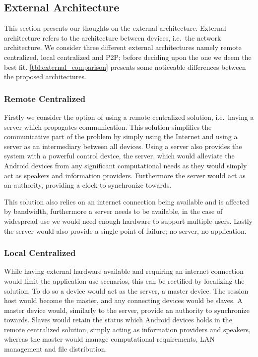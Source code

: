 \subsection{External Architecture}\label{sec:external_architectures}
This section presents our thoughts on the external architecture.
External architecture refers to the architecture between devices, i.e.\ the network architecture.
We consider three different external architectures namely remote centralized, local centralized and \ac{P2P}; before deciding upon the one we deem the best fit.
\cref{tbl:external_comparison} presents some  noticeable differences between the proposed architectures.

\subsubsection{Remote Centralized}
Firstly we consider the option of using a remote centralized solution, i.e.\ having a server which propagates communication.
This solution simplifies the communicative part of the problem by simply using the Internet and using a server as an intermediary between all devices.
Using a server also provides the system with a powerful control device, the server, which would alleviate the Android devices from any significant computational needs as they would simply act as speakers and information providers.
Furthermore the server would act as an authority, providing a clock to synchronize towards.

This solution also relies on an internet connection being available and is affected by bandwidth, furthermore a server needs to be available, in the case of widespread use we would need enough hardware to support multiple users.
Lastly the server would also provide a single point of failure; no server, no application.

\subsubsection{Local Centralized}
While having external hardware available and requiring an internet connection would limit the application use scenarios, this can be rectified by localizing the solution.
To do so a device would act as the server, a master device.
The session host would become the master, and any connecting devices would be slaves.
A master device would, similarly to the server, provide an authority to synchronize towards.
Slaves would retain the status which Android devices holds in the remote centralized solution, simply acting as information providers and speakers, whereas the master would manage computational requirements, LAN management and file distribution.

